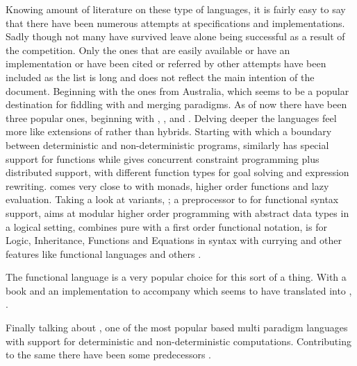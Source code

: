 \documentclass[thesis-solanki.tex]{subfiles}
\begin{document}
Knowing   amount of literature  on these type of languages, it is fairly easy to say that there have been numerous 
attempts at specifications and implementations.
Sadly though not many have survived leave alone being successful as a result of the competition.
Only the ones that are easily available or have an implementation or have been cited or referred by other attempts
have been included as the list is long and does not reflect the main intention of the document.
Beginning with the ones from Australia, which seems to be a popular destination for fiddling with 
and merging paradigms.
As of now there have been three popular ones, beginning with , \cite{website:nue-prolog},
 \cite{website:oz-mozart} and  \cite{website:mercury}.
Delving deeper the languages feel more like extensions of  rather than hybrids.
Starting with  which a boundary between deterministic and non-deterministic programs, similarly
 has special support for functions while  gives concurrent constraint programming
plus distributed support, with different function types for goal solving and expression rewriting.
 \cite{lloyd1999programming:escher} comes very close to  with monads, higher
order functions and lazy evaluation.
Taking a look at  variants,  \cite{website:ciao}; a preprocessor to
 for functional syntax support,  \cite{website:lambda-prolog} aims at
modular higher order programming with abstract data types in a logical setting, 
\cite{website:babel,moreno1992logic, moreno1988babel} combines pure  with a first order functional
notation,  \cite{website:life} is for  Logic, Inheritance, Functions and Equations in
 syntax with currying and other features like functional languages and others
\cite{bert1987lpg,malachi1984tablog}.

The functional language  is a very popular choice for this sort of a thing. With a book \cite{friedman05reasoned} and an implementation to accompany \cite{website:kanren,website:minkanren} which seems to have translated into , 
\cite{website:haskellkanren,website:molog,website:minikanrent}. 

Finally talking about , one of the most popular  based multi paradigm languages with support for deterministic and non-deterministic computations. Contributing to the same there have been some predecessors \cite{website:alf,website:toy}.       
\end{document}
